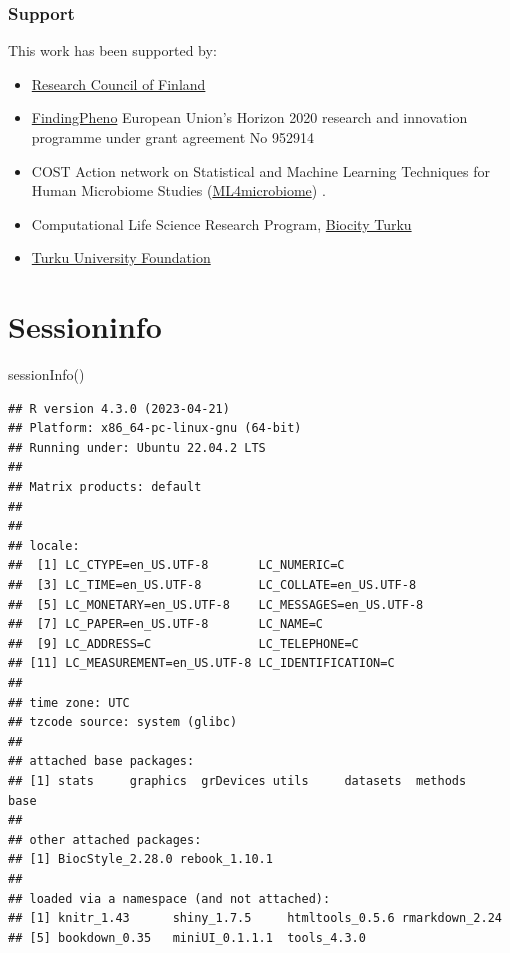 \documentclass[
]{book}
\newenvironment{Shaded}{\begin{snugshade}}{\end{snugshade}}
\newcommand{\FunctionTok}[1]{\textcolor[rgb]{0.00,0.00,0.00}{#1}}
\newcommand{\NormalTok}[1]{#1}
\begin{document}
\hypertarget{support}{%
\subsection*{Support}\label{support}}

This work has been supported by:

\begin{itemize}
\item
  \href{https://www.aka.fi/}{Research Council of Finland}
\item
  \href{https://www.findingpheno.eu/}{FindingPheno} European Union's Horizon 2020 research and innovation programme under grant agreement No 952914
\item
  COST Action network on Statistical and Machine Learning Techniques for Human Microbiome Studies
  (\href{https://www.ml4microbiome.eu/}{ML4microbiome}) \citep{MorenoIndias2021}.
\item
  Computational Life Science Research Program, \href{https://biocityturku.fi/}{Biocity Turku}
\item
  \href{https://www.yliopistosaatio.fi/en/}{Turku University Foundation}
\end{itemize}

\hypertarget{sessioninfo}{%
\chapter*{Sessioninfo}\label{sessioninfo}}

\begin{Shaded}
\begin{Highlighting}[]
\FunctionTok{sessionInfo}\NormalTok{()}
\end{Highlighting}
\end{Shaded}

\begin{verbatim}
## R version 4.3.0 (2023-04-21)
## Platform: x86_64-pc-linux-gnu (64-bit)
## Running under: Ubuntu 22.04.2 LTS
## 
## Matrix products: default
## 
## 
## locale:
##  [1] LC_CTYPE=en_US.UTF-8       LC_NUMERIC=C              
##  [3] LC_TIME=en_US.UTF-8        LC_COLLATE=en_US.UTF-8    
##  [5] LC_MONETARY=en_US.UTF-8    LC_MESSAGES=en_US.UTF-8   
##  [7] LC_PAPER=en_US.UTF-8       LC_NAME=C                 
##  [9] LC_ADDRESS=C               LC_TELEPHONE=C            
## [11] LC_MEASUREMENT=en_US.UTF-8 LC_IDENTIFICATION=C       
## 
## time zone: UTC
## tzcode source: system (glibc)
## 
## attached base packages:
## [1] stats     graphics  grDevices utils     datasets  methods   base     
## 
## other attached packages:
## [1] BiocStyle_2.28.0 rebook_1.10.1   
## 
## loaded via a namespace (and not attached):
## [1] knitr_1.43      shiny_1.7.5     htmltools_0.5.6 rmarkdown_2.24 
## [5] bookdown_0.35   miniUI_0.1.1.1  tools_4.3.0
\end{verbatim}

  
\end{document}
